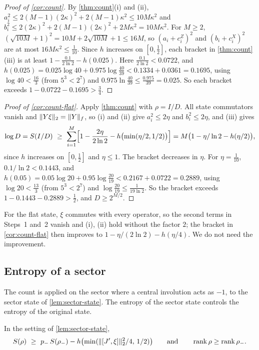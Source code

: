 \begin{proof}[Proof of \cref{cor:count}]
By \cref{thm:count}(i) and (ii), $a_i^2\le2(M-1)(2\kappa)^2+2(M-1)\kappa^2\le10M\kappa^2$ and
$b_i^2\le2(2\kappa)^2+2(M-1)(2\kappa)^2+2M\kappa^2=10M\kappa^2$. For $M\ge2$, $(\sqrt{10M}+1)^2=10M+2\sqrt{10M}+1\le16M$, so
$(a_i+c^Z_i)^2$ and $(b_i+c^X_i)^2$ are at most $16M\kappa^2\le\frac1{10}$. Since $h$ increases on $[0,\frac12]$, each bracket in
\cref{thm:count}(iii) is at least $1-\frac{0.1}{2\ln2}-h(0.025)$. Here $\frac{0.1}{2\ln2}<0.0722$, and
$h(0.025)=0.025\log40+0.975\log\frac{40}{39}<0.1334+0.0361=0.1695$, using $\log40<\frac{16}3$ (from $5^3<2^7$) and
$0.975\ln\frac{40}{39}\le\frac{0.975}{39}=0.025$. So each bracket exceeds $1-0.0722-0.1695>\frac34$.
\end{proof}

\begin{proof}[Proof of \cref{cor:count-flat}]
Apply \cref{thm:count} with $\rho=I/D$. All state commutators vanish and $\lVert Y\xi\rVert_2=\lVert Y\rVert_f$, so (i) and (ii) give $a_i^2\le2\eta$ and
$b_i^2\le2\eta$, and (iii) gives
\[
\log D=S(I/D)\ \ge\ \sum_{i=1}^M\Bigl[1-\frac{2\eta}{2\ln2}-h\bigl(\min(\eta/2,1/2)\bigr)\Bigr]=M\bigl(1-\eta/\ln2-h(\eta/2)\bigr),
\]
since $h$ increases on $[0,\frac12]$ and $\eta\le1$. The bracket decreases in $\eta$. For $\eta=\frac1{10}$, $0.1/\ln2<0.1443$, and
$h(0.05)=0.05\log20+0.95\log\frac{20}{19}<0.2167+0.0722=0.2889$, using $\log20<\frac{13}3$ (from $5^3<2^7$) and
$\log\frac{20}{19}\le\frac1{19\ln2}$. So the bracket exceeds $1-0.1443-0.2889>\frac12$, and $D\ge2^{M/2}$.
\end{proof}

For the flat state, $\xi$ commutes with every operator, so the second terms in Steps~1 and~2 vanish and (i), (ii) hold without the
factor $2$; the bracket in \cref{cor:count-flat} then improves to $1-\eta/(2\ln2)-h(\eta/4)$. We do not need the improvement.

\subsection{Entropy of a sector}

The count is applied on the sector where a central involution acts as $-1$, to the sector state of \cref{lem:sector-state}. The entropy of
the sector state controls the entropy of the original state.

\begin{lemma}\label{lem:sector-entropy}
In the setting of \cref{lem:sector-state},
\[
S(\rho)\ \ge\ p_-\,S(\rho_-)-h\bigl(\min(\hs{[J',\xi]}^2/4,\,1/2)\bigr)\qquad\text{and}\qquad\rank\rho\ge\rank\rho_- .
\]
\end{lemma}

